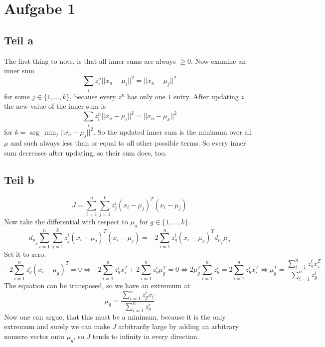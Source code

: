 \documentclass[10pt,a4paper]{article}
\begin{document}
\section{Aufgabe 1}

\subsection{Teil a}

The first thing to note, is that all inner sums are always $\ge 0$. Now examine
an inner sum
\begin{equation}
  \sum_{i} z_{i}^{n} ||x_{n} - \mu_{i}||^{2} = ||x_{n} - \mu_{j}||^{2}
\end{equation}
for some $j \in \{ 1, \dots, k \}$, because every $z^{n}$ has only one $1$
entry. After updating $z$ the new value of the inner sum is
\begin{equation}
  \sum_{i} z_{i}^{n} ||x_{n} - \mu_{i}||^{2} = ||x_{n} - \mu_{k}||^{2}
\end{equation}
for $k = \arg\,\min_{j} ||x_{n} - \mu_{j}||^{2}$. So the updated inner sum is
the minimum over all $\mu$ and such always less than or equal to all other
possible terms. So every inner sum decreases after updating, so their sum does,
too.

\subsection{Teil b}

\begin{equation}
  J = \sum_{i = 1}^{n} \sum_{j = 1}^{k} z_{j}^{i} (x_{i} - \mu_{j})^{T}(x_{i} - \mu_{j})
\end{equation}
Now take the differential with respect to $\mu_{g}$ for $g \in \{ 1, \dots, k \}$.
\begin{equation}
  d_{\mu_{g}} \sum_{i = 1}^{n} \sum_{j = 1}^{k} z_{j}^{i} (x_{i} - \mu_{j})^{T}(x_{i} - \mu_{j}) = -2 \sum_{i = 1}^{n} z_{g}^{i} (x_{i} - \mu_{g})^{T}d_{\mu_{g}}\mu_{g}
\end{equation}
Set it to zero.
\begin{equation}
  -2 \sum_{i = 1}^{n} z_{g}^{i} (x_{i} - \mu_{g})^{T} = 0 \Leftrightarrow -2 \sum_{i = 1}^{n} z_{g}^{i} x_{i}^{T} + 2 \sum_{i = 1}^{n} z_{g}^{i} \mu_{g}^{T} = 0 \Leftrightarrow 2 \mu_{g}^{T} \sum_{i = 1}^{n} z_{g}^{i} = 2 \sum_{i = 1}^{n} z_{g}^{i} x_{i}^{T} \Leftrightarrow \mu_{g}^{T} = \frac{\sum_{i = 1}^{n} z_{g}^{i} x_{i}^{T}}{\sum_{i = 1}^{n} z_{g}^{i}}
\end{equation}
The equation can be transposed, so we have an extremum at
\begin{equation}
  \mu_{g} = \frac{\sum_{i = 1}^{n} z_{g}^{i} x_{i}}{\sum_{i = 1}^{n} z_{g}^{i}}
\end{equation}
Now one can argue, that this must be a minimum, because it is the only extremum
and surely we can make $J$ arbitrarily large by adding an arbitrary nonzero
vector onto $\mu_{g}$, so $J$ tends to infinity in every direction.
\end{document}
